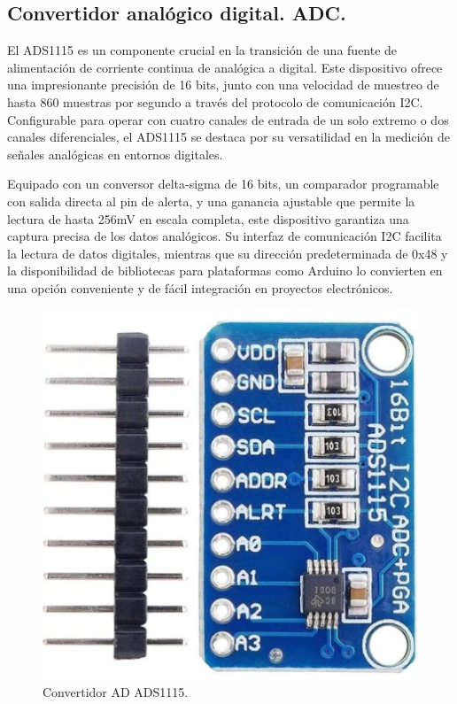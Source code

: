 \subsection{Convertidor analógico digital. ADC.}
El ADS1115 es un componente crucial en la transición de una fuente de alimentación de corriente continua de analógica a digital. Este dispositivo ofrece una impresionante precisión de 16 bits, junto con una velocidad de muestreo de hasta 860 muestras por segundo a través del protocolo de comunicación I2C. Configurable para operar con cuatro canales de entrada de un solo extremo o dos canales diferenciales, el ADS1115 se destaca por su versatilidad en la medición de señales analógicas en entornos digitales. \par 
Equipado con un conversor delta-sigma de 16 bits, un comparador programable con salida directa al pin de alerta, y una ganancia ajustable que permite la lectura de hasta 256mV en escala completa, este dispositivo garantiza una captura precisa de los datos analógicos. Su interfaz de comunicación I2C facilita la lectura de datos digitales, mientras que su dirección predeterminada de 0x48 y la disponibilidad de bibliotecas para plataformas como Arduino lo convierten en una opción conveniente y de fácil integración en proyectos electrónicos.\par 
\begin{figure}[H]
    \centering
    \includegraphics[scale=0.3]{./imagenes/ads1115.jpg}
    \caption{Convertidor AD ADS1115.}
    \label{F:ADC}
\end{figure}

